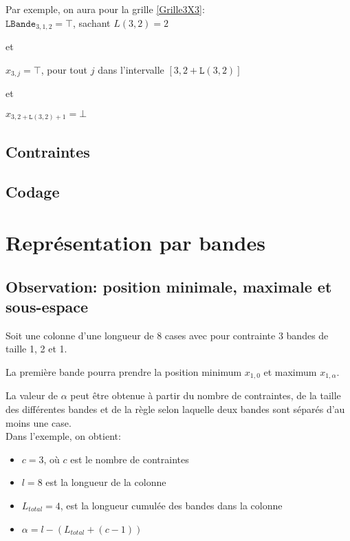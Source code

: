 \documentclass[a4paper,12pt]{report}
\begin{document}
Par exemple, on aura pour la grille \ref{Grille3X3}:\\

$\mathtt{LBande}_{3,1,2} = \top$, sachant $L(3,2) = 2$ 

et

$x_{3,j} = \top$, pour tout $j$ dans l'intervalle $ [3,2+\mathtt{L}(3,2)]$

et

$x_{3,2+\mathtt{L}(3,2)+1} = \bot  $

\subsection{Contraintes}


\subsection{Codage}
\section{Représentation par bandes}
\subsection{Observation: position minimale, maximale et sous-espace}

Soit une colonne d'une longueur de 8 cases avec pour contrainte 3 bandes de taille 1, 2 et 1.

La première bande pourra prendre la position minimum $x_{1,0}$ et maximum $x_{1,\alpha}$.

La valeur de $\alpha$ peut être obtenue à partir du nombre de contraintes, de la taille des différentes bandes et de la règle selon laquelle deux bandes sont séparés d'au moins une case.\\

Dans l'exemple, on obtient:
\begin{itemize}
\item[] $c = 3$, où $c$ est le nombre de contraintes
\item[] $l = 8$ est la longueur de la colonne
\item[] $L_{total} = 4$, est la longueur cumulée des bandes dans la colonne
\item[] $\alpha = l-(L_{total}+(c-1))$
\end{itemize}
\end{document}
